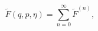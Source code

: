 \begin{equation}
 \tilde{F}(q,p,\eta)=\sum_{n=0}^\infty\tilde{F}^{(n)},
  \label{a23}
  \end{equation}


